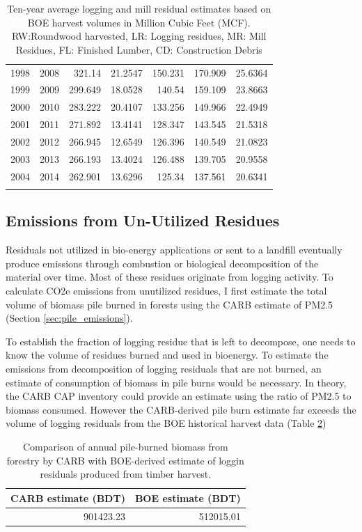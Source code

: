 \documentclass[a4paper,titlepage]{article}
\begin{document}
\begin{longtable}{rrrrrrr}
1998 & 2008 & 321.14 & 21.2547 & 150.231 & 170.909 & 25.6364\\
1999 & 2009 & 299.649 & 18.0528 & 140.54 & 159.109 & 23.8663\\
2000 & 2010 & 283.222 & 20.4107 & 133.256 & 149.966 & 22.4949\\
2001 & 2011 & 271.892 & 13.4141 & 128.347 & 143.545 & 21.5318\\
2002 & 2012 & 266.945 & 12.6549 & 126.396 & 140.549 & 21.0823\\
2003 & 2013 & 266.193 & 13.4024 & 126.488 & 139.705 & 20.9558\\
2004 & 2014 & 262.901 & 13.6296 & 125.34 & 137.561 & 20.6341\\
\caption{Ten-year average logging and mill residual estimates based on BOE harvest volumes in Million Cubic Feet (MCF). RW:Roundwood harvested, LR: Logging residues, MR: Mill Residues, FL: Finished Lumber, CD: Construction Debris \label{tab:me_lr}}
\\
\end{longtable}

\subsection{Emissions from Un-Utilized Residues}
\label{sec:orgheadline17}
\label{sec:boe_lr_emiss}

Residuals not utilized in bio-energy applications or sent to a landfill eventually 
produce emissions through combustion or biological decomposition of the
material over time. Most of these residues originate from logging activity.  
To calculate \ac{CO2e} emissions from unutilized residues, I first estimate the total volume of biomass  pile burned in forests using the \ac{CARB} estimate of \ac{PM2.5} (Section \ref{sec:pile_emissions}). 

To establish the fraction of logging residue that is left to decompose, one needs to know the volume of residues burned and used in bioenergy. 
To estimate the emissions from decomposition of logging residuals that are not burned, an estimate of consumption of biomass in pile burns would be necessary. In theory, the \ac{CARB} \ac{CAP} inventory could provide an estimate using the ratio of \ac{PM2.5} to biomass consumed. However the \ac{CARB}-derived pile burn estimate far exceeds the volume of logging residuals from the \ac{BOE} historical harvest data (Table \ref{tab:pbc})

\begin{table}[htb]
\centering
\begin{tabular}{rr}
\ac{CARB} estimate (BDT) & \ac{BOE} estimate (BDT)\\
\hline
901423.23 & 512015.01\\
\end{tabular}
\caption{Comparison of annual pile-burned biomass from forestry by \ac{CARB} with \ac{BOE}-derived estimate of loggin residuals produced from timber harvest. \label{tab:pbc}}

\end{table}
\end{document}
